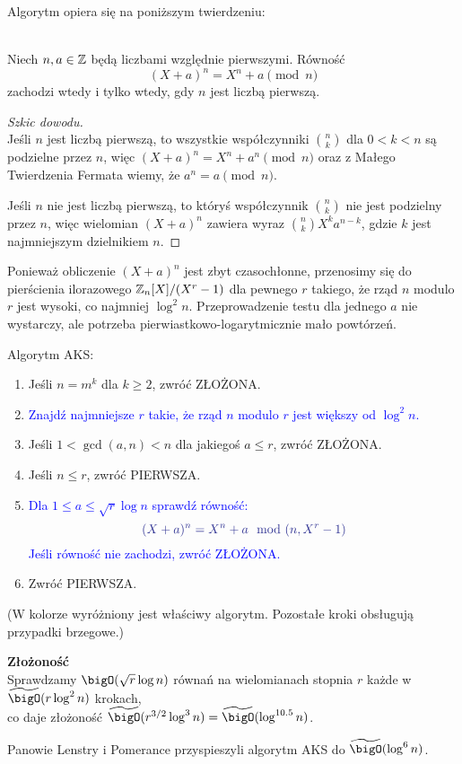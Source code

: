 Algorytm opiera się na poniższym twierdzeniu:

\begin{theorem} \\
Niech \( n, a \in \mathbb{Z} \) będą liczbami względnie pierwszymi. Równość
\[
    (X + a)^n = X^n + a \pmod{n}
\]
zachodzi wtedy i tylko wtedy, gdy \( n \) jest liczbą pierwszą.
\end{theorem}
\begin{proof}[Szkic dowodu]\\
Jeśli \( n \) jest liczbą pierwszą, to wszystkie współczynniki \( n \choose k \) dla \( 0 < k < n \) są podzielne przez \( n \), więc \( (X + a)^n = X^n + a^n \pmod{n} \) oraz z Małego Twierdzenia Fermata wiemy, że \( a^n = a \pmod{n} \).

Jeśli \( n \) nie jest liczbą pierwszą, to któryś współczynnik \( n \choose k \) nie jest podzielny przez \( n \), więc wielomian \( (X + a)^n \) zawiera wyraz \( {n \choose k} X^ka^{n-k} \), gdzie \( k \) jest najmniejszym dzielnikiem \( n \).
\end{proof}

Ponieważ obliczenie \( (X + a)^n \) jest zbyt czasochłonne, przenosimy się do pierścienia ilorazowego \( \mathbb{Z}_n[X]/(X^r - 1) \) dla pewnego \( r \) takiego, że rząd \( n \)
modulo \( r \) jest wysoki, co najmniej \( \log^2n \). Przeprowadzenie testu dla jednego \( a \) nie wystarczy, ale potrzeba pierwiastkowo-logarytmicznie mało powtórzeń.

\newpage
\begin{greyframe}
    Algorytm AKS:
    \begin{enumerate}
        \item Jeśli \( n = m^k \) dla \( k \geq 2 \), zwróć ZŁOŻONA.
        \item \textcolor{Blue}{Znajdź najmniejsze \( r \) takie, że rząd \( n \) modulo \( r \) jest większy od \( \log^2n \).}
        \item Jeśli \( 1 < \gcd(a, n) < n \) dla jakiegoś \( a \leq r \), zwróć ZŁOŻONA.
        \item Jeśli \( n \leq r \), zwróć PIERWSZA.
        \item \textcolor{Blue}{Dla \( 1 \leq a \leq \sqrt{r}\log n \) sprawdź równość:}
        \[
            \textcolor{Blue}{(X + a)^n = X^n + a \mod (n, X^r-1)}
        \]
        \textcolor{Blue}{Jeśli równość nie zachodzi, zwróć ZŁOŻONA.}
        \item Zwróć PIERWSZA.
    \end{enumerate}
\end{greyframe}
{\small (W kolorze wyróżniony jest właściwy algorytm. Pozostałe kroki obsługują przypadki brzegowe.)}

\textbf{Złożoność} \\
Sprawdzamy \( \bigO(\sqrt{r} \log n) \) równań na wielomianach stopnia \( r \) każde w \( \widetilde{\bigO}(r \log^2n) \) krokach, \\ co daje złożoność \( \widetilde{\bigO}(r^{3/2} \log^3n) = \widetilde{\bigO}(\log^{10.5}n)\).

Panowie Lenstry i Pomerance przyspieszyli algorytm AKS do \( \widetilde{\bigO}(\log^6n) \).
